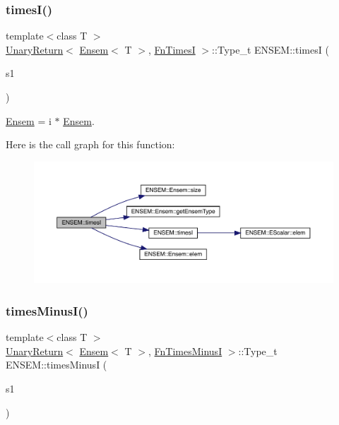 \subsubsection{\texorpdfstring{timesI()}{timesI()}}
{\footnotesize\ttfamily template$<$class T $>$ \\
\mbox{\hyperlink{structENSEM_1_1UnaryReturn}{Unary\+Return}}$<$ \mbox{\hyperlink{classENSEM_1_1Ensem}{Ensem}}$<$ T $>$, \mbox{\hyperlink{structENSEM_1_1FnTimesI}{Fn\+TimesI}} $>$\+::Type\+\_\+t E\+N\+S\+E\+M\+::timesI (\begin{DoxyParamCaption}\item[{const \mbox{\hyperlink{classENSEM_1_1Ensem}{Ensem}}$<$ T $>$ \&}]{s1 }\end{DoxyParamCaption})\hspace{0.3cm}{\ttfamily [inline]}}



\mbox{\hyperlink{classENSEM_1_1Ensem}{Ensem}} = i $\ast$ \mbox{\hyperlink{classENSEM_1_1Ensem}{Ensem}}. 

Here is the call graph for this function\+:\nopagebreak
\begin{figure}[H]
\begin{center}
\leavevmode
\includegraphics[width=350pt]{d1/d9e/group__eensem_ga3fc5873019ba3366e2e3fd6cad8632bd_cgraph}
\end{center}
\end{figure}
\mbox{\label{group__eensem_ga405bf45509ebc2aed7e0bc4423e24849}} 
\subsubsection{\texorpdfstring{timesMinusI()}{timesMinusI()}}
{\footnotesize\ttfamily template$<$class T $>$ \\
\mbox{\hyperlink{structENSEM_1_1UnaryReturn}{Unary\+Return}}$<$ \mbox{\hyperlink{classENSEM_1_1Ensem}{Ensem}}$<$ T $>$, \mbox{\hyperlink{structENSEM_1_1FnTimesMinusI}{Fn\+Times\+MinusI}} $>$\+::Type\+\_\+t E\+N\+S\+E\+M\+::times\+MinusI (\begin{DoxyParamCaption}\item[{const \mbox{\hyperlink{classENSEM_1_1Ensem}{Ensem}}$<$ T $>$ \&}]{s1 }\end{DoxyParamCaption})\hspace{0.3cm}{\ttfamily [inline]}}



